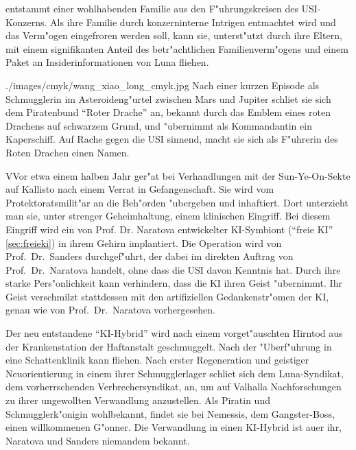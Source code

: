 \newpage
{}

\xls{} entstammt einer wohlhabenden Familie aus den F"uhrungskreisen des USI-Konzerns. Als ihre Familie durch konzerninterne Intrigen entmachtet wird und das Verm"ogen eingefroren werden soll, kann sie, unterst"utzt durch ihre Eltern, mit einem signifikanten Anteil des betr"achtlichen Familienverm"ogens und einem Paket an Insiderinformationen von Luna fliehen.

\begin{sideimagebox}[r]{0.64}{./images/cmyk/wang_xiao_long_cmyk.jpg}{}
    Nach einer kurzen Episode als Schmugglerin im Asteroideng"urtel zwischen Mars und Jupiter schlie\3t sie sich dem Piratenbund ``Roter Drache'' an, bekannt durch das Emblem eines roten Drachens auf schwarzem Grund, und "ubernimmt als Kommandantin ein Kaperschiff. Auf Rache gegen die USI sinnend, macht sie sich als F"uhrerin des Roten Drachen einen Namen.

    VVor etwa einem halben Jahr ger"at \xls{} bei Verhandlungen mit der Sun-Ye-On-Sekte auf Kallisto nach einem Verrat in Gefangenschaft. Sie wird vom Protektoratsmilit"ar an die Beh"orden "ubergeben und inhaftiert. Dort unterzieht man sie, unter strenger Geheimhaltung, einem klinischen Eingriff. Bei diesem Eingriff wird ein von Prof. Dr. Naratova entwickelter KI-Symbiont (``freie KI'' \cref{sec:freieki}) in ihrem Gehirn implantiert. Die Operation wird von Prof.~Dr.~Sanders durchgef"uhrt, der dabei im direkten Auftrag von Prof.~Dr.~Naratova handelt, ohne dass die USI davon Kenntnis hat. Durch ihre starke Pers"onlichkeit kann \xls{} verhindern, dass die KI ihren Geist "ubernimmt. Ihr Geist verschmilzt stattdessen mit den artifiziellen Gedankenstr"omen der KI, genau wie von Prof.~Dr.~Naratova vorhergesehen.
\end{sideimagebox}

Der neu entstandene ``KI-Hybrid'' wird nach einem vorget"auschten Hirntod aus der Krankenstation der Haftanstalt geschmuggelt. Nach der "Uberf"uhrung in eine Schattenklinik kann \xl{} fliehen. Nach erster Regeneration und geistiger Neuorientierung in einem ihrer Schmugglerlager schlie\3t sich \xl{} dem Luna-Syndikat, dem vorherrschenden Verbrechersyndikat, an, um auf Valhalla Nachforschungen zu ihrer ungewollten Verwandlung anzustellen. Als Piratin und Schmugglerk"onigin wohlbekannt, findet sie bei Nemessis, dem Gangster-Boss, einen willkommenen G"onner. Die Verwandlung in einen KI-Hybrid ist au\3er ihr, Naratova und Sanders niemandem bekannt.


